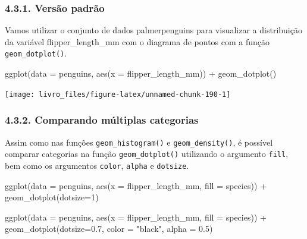 \documentclass[
]{book}
\newenvironment{Shaded}{\begin{snugshade}}{\end{snugshade}}
\newcommand{\AttributeTok}[1]{\textcolor[rgb]{0.61,0.61,0.61}{#1}}
\newcommand{\DecValTok}[1]{\textcolor[rgb]{0.06,0.06,0.06}{#1}}
\newcommand{\FloatTok}[1]{\textcolor[rgb]{0.06,0.06,0.06}{#1}}
\newcommand{\FunctionTok}[1]{\textcolor[rgb]{0,0,0}{#1}}
\newcommand{\NormalTok}[1]{#1}
\newcommand{\SpecialCharTok}[1]{\textcolor[rgb]{0,0,0}{#1}}
\newcommand{\StringTok}[1]{\textcolor[rgb]{0.5,0.5,0.5}{#1}}
\begin{document}
\hypertarget{versuxe3o-padruxe3o-2}{%
\subsubsection{4.3.1. Versão padrão}\label{versuxe3o-padruxe3o-2}}

Vamos utilizar o conjunto de dados palmerpenguins para visualizar a distribuição da variável flipper\_length\_mm com o diagrama de pontos com a função \texttt{geom\_dotplot()}.

\begin{Shaded}
\begin{Highlighting}[]

\FunctionTok{ggplot}\NormalTok{(}\AttributeTok{data =}\NormalTok{ penguins, }
       \FunctionTok{aes}\NormalTok{(}\AttributeTok{x =}\NormalTok{ flipper\_length\_mm)) }\SpecialCharTok{+}
  \FunctionTok{geom\_dotplot}\NormalTok{()}
\end{Highlighting}
\end{Shaded}

\begin{center}\texttt{[image: livro\_files/figure-latex/unnamed-chunk-190-1]} \end{center}

\hypertarget{comparando-muxfaltiplas-categorias-2}{%
\subsubsection{4.3.2. Comparando múltiplas categorias}\label{comparando-muxfaltiplas-categorias-2}}

Assim como nas funções \texttt{geom\_histogram()} e \texttt{geom\_density()}, é possível comparar categorias na função \texttt{geom\_dotplot()} utilizando o argumento \texttt{fill}, bem como os argumentos \texttt{color}, \texttt{alpha} e \texttt{dotsize}.

\begin{Shaded}
\begin{Highlighting}[]
\FunctionTok{ggplot}\NormalTok{(}\AttributeTok{data =}\NormalTok{ penguins, }
       \FunctionTok{aes}\NormalTok{(}\AttributeTok{x =}\NormalTok{ flipper\_length\_mm, }\AttributeTok{fill =}\NormalTok{ species)) }\SpecialCharTok{+}
  \FunctionTok{geom\_dotplot}\NormalTok{(}\AttributeTok{dotsize=}\DecValTok{1}\NormalTok{)}

\FunctionTok{ggplot}\NormalTok{(}\AttributeTok{data =}\NormalTok{ penguins, }
       \FunctionTok{aes}\NormalTok{(}\AttributeTok{x =}\NormalTok{ flipper\_length\_mm, }\AttributeTok{fill =}\NormalTok{ species)) }\SpecialCharTok{+}
  \FunctionTok{geom\_dotplot}\NormalTok{(}\AttributeTok{dotsize=}\FloatTok{0.7}\NormalTok{, }
               \AttributeTok{color =} \StringTok{"black"}\NormalTok{, }
               \AttributeTok{alpha =} \FloatTok{0.5}\NormalTok{)}
\end{Highlighting}
\end{Shaded}
\end{document}
